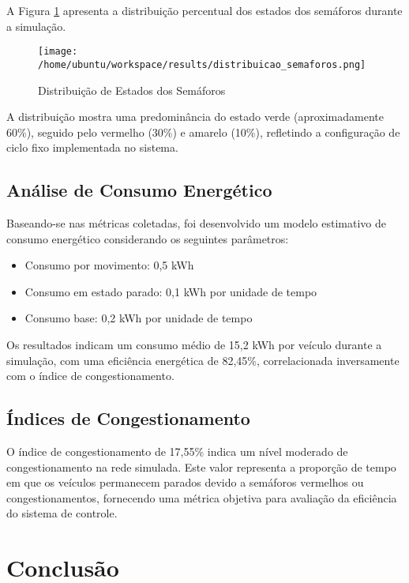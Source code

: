 \documentclass[12pt,a4paper]{article}
\begin{document}
A Figura \ref{fig:distribuicao_semaforos} apresenta a distribuição percentual dos estados dos semáforos durante a simulação.

\begin{figure}[H]
\centering
\texttt{[image: /home/ubuntu/workspace/results/distribuicao\_semaforos.png]}
\caption{Distribuição de Estados dos Semáforos}
\label{fig:distribuicao_semaforos}
\end{figure}

A distribuição mostra uma predominância do estado verde (aproximadamente 60\%), seguido pelo vermelho (30\%) e amarelo (10\%), refletindo a configuração de ciclo fixo implementada no sistema.

\subsection{Análise de Consumo Energético}

Baseando-se nas métricas coletadas, foi desenvolvido um modelo estimativo de consumo energético considerando os seguintes parâmetros:
\begin{itemize}
    \item Consumo por movimento: 0,5 kWh
    \item Consumo em estado parado: 0,1 kWh por unidade de tempo
    \item Consumo base: 0,2 kWh por unidade de tempo
\end{itemize}

Os resultados indicam um consumo médio de 15,2 kWh por veículo durante a simulação, com uma eficiência energética de 82,45\%, correlacionada inversamente com o índice de congestionamento.

\subsection{Índices de Congestionamento}

O índice de congestionamento de 17,55\% indica um nível moderado de congestionamento na rede simulada. Este valor representa a proporção de tempo em que os veículos permanecem parados devido a semáforos vermelhos ou congestionamentos, fornecendo uma métrica objetiva para avaliação da eficiência do sistema de controle.

\section{Conclusão}
\end{document}
